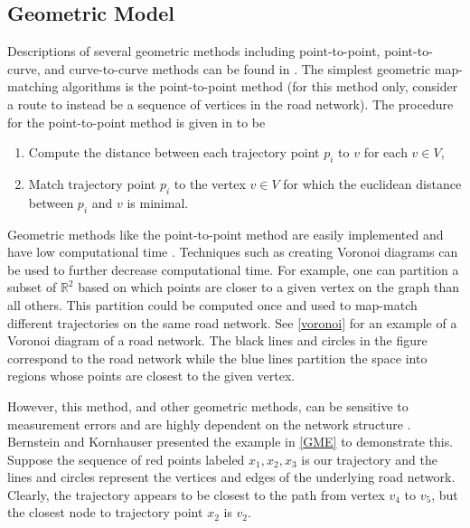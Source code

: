 \documentclass{article}
\numberwithin{equation}{section}
\theoremstyle{definition}
\begin{document}
\subsection{Geometric Model}
Descriptions of several geometric methods including point-to-point, point-to-curve, and curve-to-curve methods can be found in \cite{BK}. The simplest geometric map-matching algorithms is the point-to-point method (for this method only, consider a route to instead be a sequence of vertices in the road network). The procedure for the point-to-point method is given in \cite{BK} to be
\begin{enumerate}
\item Compute the distance between each trajectory point $p_i$ to $v$ for each $v\in V$,
\item Match trajectory point $p_i$ to the vertex $v\in V$ for which the euclidean distance between $p_i$ and $v$ is minimal. 
\end{enumerate}
Geometric methods like the point-to-point method are easily implemented and have low computational time \cite{BK}. Techniques such as creating Voronoi diagrams can be used to further decrease computational time. For example, one can partition a subset of $\mathbb{R}^{2}$ based on which points are closer to a given vertex on the graph than all others. This partition could be computed once and used to map-match different trajectories on the same road network. See \autoref{voronoi} for an example of a Voronoi diagram of a road network. The black lines and circles in the figure correspond to the road network while the blue lines partition the space into regions whose points are closest to the given vertex.


However, this method, and other geometric methods, can be sensitive to measurement errors and are highly dependent on the network structure \cite{BK}. Bernstein and Kornhauser presented the example in \autoref{GME} to demonstrate this. Suppose the sequence of red points labeled $x_1,x_2,x_3$ is our trajectory and the lines and circles represent the vertices and edges of the underlying road network. Clearly, the trajectory appears to be closest to the path from vertex $v_4$ to $v_5$, but the closest node to trajectory point $x_2$ is $v_2$.
\end{document}
